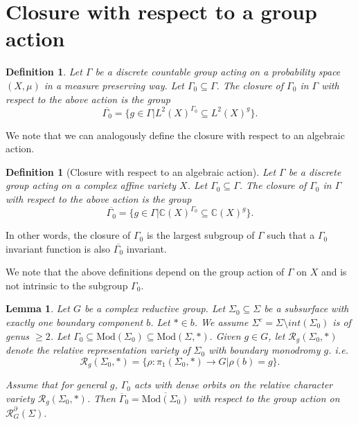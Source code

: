 \documentclass{article}
\newcommand{\Rc}{\mathcal{R}}
\newcommand{\CC}{\mathbb{C}}
\newcommand{\Mod}{\textrm{Mod}}
\newtheorem{definition}[theorem]{Definition}
\newtheorem{lemma}{Lemma}[theorem]
\begin{document}
\section{Closure with respect to a group action}
\begin{definition}
    Let $\Gamma$ be a discrete countable group acting on a probability space $(X,\mu)$ in a measure preserving way.   Let $\Gamma_0 \subseteq \Gamma$. The closure of $\Gamma_0$ in $\Gamma$ with respect to the above action is the group $$\overline{\Gamma_0} = \{g \in \Gamma |L^2(X)^{\Gamma_0} \subseteq L^2(X)^g\}.$$
\end{definition}
We note that we can analogously define the closure with respect to an algebraic action.
\begin{definition}[Closure with respect to an algebraic action]
    Let $\Gamma$ be a discrete group acting on a complex affine variety $X$. Let $\Gamma_0 \subseteq \Gamma$. The closure of $\Gamma_0$ in $\Gamma$ with respect to the above action is the group $$\overline{\Gamma_0} = \{g \in \Gamma |\CC(X)^{\Gamma_0} \subseteq \CC(X)^g\}.$$
\end{definition}

In other words, the closure of $\Gamma_0$ is the largest subgroup of $\Gamma$ such that a $\Gamma_0$ invariant function is also $\overline{\Gamma_0}$ invariant.

We note that the above definitions depend on the group action of $\Gamma$ on $X$ and is not intrinsic to the subgroup $\Gamma_0$.



\begin{lemma}\label{changeofclosurealg}
    Let $G$ be a complex reductive group.
    Let $\Sigma_0 \subseteq \Sigma$ be a subsurface with exactly one boundary component $b$. Let $* \in b$. We assume $\Sigma^c = \Sigma \setminus int( \Sigma_0)$ is of genus $\ge 2$.
Let $\Gamma _0 \subseteq \Mod(\Sigma_0) \subseteq \Mod(\Sigma,*).$ Given $g \in G$, let  $\Rc_g(\Sigma_0, *)$ denote the relative representation variety of $\Sigma_0$ with boundary monodromy $g$. i.e. $$\Rc_g(\Sigma_0, *) = \{\rho : \pi_1(\Sigma_0,*) \to G | \rho(b) =g\}.$$

Assume that for general $g$, $\Gamma_0$ acts with dense orbits on the relative character variety $\Rc_g(\Sigma_0, *)$. Then $\overline\Gamma_0 = \overline{\Mod(\Sigma_0)}$ with respect to the group action on $\Rc_G^{\partial}(\Sigma).$
\end{lemma}
\end{document}
